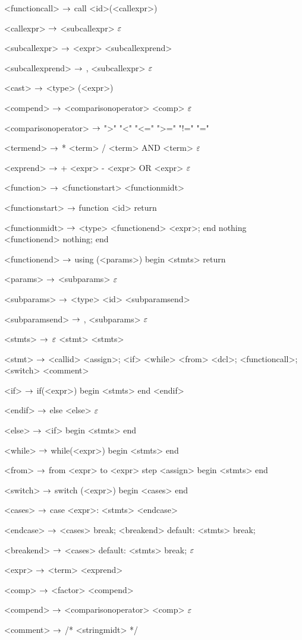 \begin{grammar}
<functioncall> $\rightarrow$ call <id>(<callexpr>)

<callexpr> $\rightarrow$ <subcallexpr>
\alt $\varepsilon$

<subcallexpr> $\rightarrow$ <expr> <subcallexprend>

<subcallexprend> $\rightarrow$ , <subcallexpr>
\alt $\varepsilon$

<cast> $\rightarrow$ <type> (<expr>)

<compend> $\rightarrow$ <comparisonoperator> <comp>
\alt $\varepsilon$

<comparisonoperator> $\rightarrow$ ">"
				\alt "<"
				\alt "<="
				\alt ">="
				\alt "!="
				\alt "="

<termend> $\rightarrow$ * <term>
\alt / <term>
\alt AND <term>
\alt $\varepsilon$

<exprend> $\rightarrow$ + <expr>
\alt - <expr>
\alt OR <expr>
\alt $\varepsilon$

<function> $\rightarrow$  <functionstart> <functionmidt>

<functionstart> $\rightarrow$ function <id> return

<functionmidt> $\rightarrow$ <type> <functionend> <expr>; end
\alt nothing <functionend> nothing; end

<functionend> $\rightarrow$
using (<params>)
begin
	<stmts>
	return

<params> $\rightarrow$ <subparams>
	\alt $\varepsilon$

<subparams> $\rightarrow$ <type> <id> <subparamsend>

<subparamsend> $\rightarrow$ , <subparams>
\alt $\varepsilon$

<stmts> $\rightarrow$ $\varepsilon$
	\alt <stmt> <stmts>

<stmt> $\rightarrow$ <callid> <assign>;
	\alt <if>
	\alt <while>
	\alt <from>
	\alt <dcl>;
	\alt <functioncall>;
	\alt <switch>
	\alt <comment>
	
<if> $\rightarrow$ if(<expr>)
	begin
		<stmts>
	end
	<endif>

<endif> $\rightarrow$ 
	else <else>
	\alt $\varepsilon$

<else> $\rightarrow$ <if>
	\alt begin
		<stmts>
	end

<while> $\rightarrow$ while(<expr>)
		begin
			<stmts>
		end
		
<from> $\rightarrow$ from <expr> to <expr> step <assign>
	begin
		<stmts>
	end

<switch> $\rightarrow$ switch (<expr>)
		begin
			<cases>
		end

<cases> $\rightarrow$ case <expr>:
			<stmts>
		<endcase>
		
<endcase> $\rightarrow$ <cases>
		\alt break; <breakend>
		\alt default:
			<stmts>
			break;

<breakend> $\rightarrow$ <cases>
\alt default:
<stmts>
break;
\alt $\varepsilon$

<expr> $\rightarrow$ <term> <exprend>


<comp> $\rightarrow$ <factor> <compend>

<compend> $\rightarrow$ <comparisonoperator> <comp>
\alt $\varepsilon$

<comment> $\rightarrow$ /* <stringmidt> */


\end{grammar}